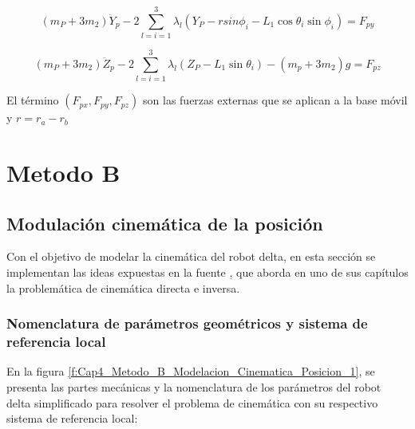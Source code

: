     \begin{equation}
     \left( m_{P}+3m_{2} \right) \ddot{Y}_{p}-2 \sum _{l=i=1}^{3} \lambda _{l} \left( Y_{P}- rsin \phi _{i}-L_{1}\cos  \theta _{i}\sin  \phi _{i} \right) =F_{py} 
        \label{eq:cap4_dina_ma_13}
    \end{equation}

    \begin{equation}
      \left( m_{P}+3m_{2} \right) \ddot{Z}_{p}-2 \sum _{l=i=1}^{3} \lambda _{l} \left( Z_{P}-L_{1}\sin  \theta _{i} \right) - \left( m_{p}+3m_{2} \right) g=F_{pz} 
        \label{eq:cap4_dina_ma_14}
    \end{equation}

    El término $ \left( F_{px},F_{py},F_{pz} \right)$ son las fuerzas externas que se aplican a la base móvil y   $r=r_{a}-r_{b} $







    \newpage


\section{Metodo B}

    \subsection{Modulación cinemática de la posición}\label{MB_MP}
    
            Con el objetivo de modelar la cinemática del robot delta, en esta sección se implementan las ideas expuestas en la fuente \cite{Path_Planning_and_Trajectory_Optimization}, que aborda en uno de sus capítulos la problemática de cinemática directa e inversa.
    
        \subsubsection{Nomenclatura de parámetros geométricos y sistema de referencia local}

            En la figura \ref{f:Cap4_Metodo_B_Modelacion_Cinematica_Posicion_1}, se presenta las partes mecánicas y la nomenclatura de los parámetros del robot delta simplificado para resolver el problema de cinemática con su respectivo sistema de referencia local:

